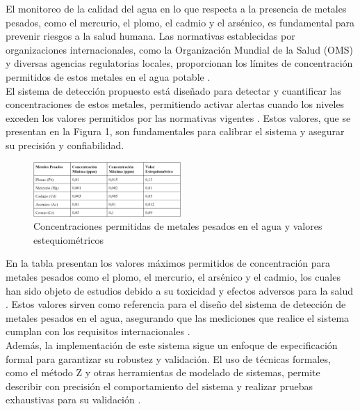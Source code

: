 El monitoreo de la calidad del agua en lo que respecta a la presencia de metales pesados, como el mercurio, el plomo, el cadmio y el arsénico, es fundamental para prevenir riesgos a la salud humana. Las normativas establecidas por organizaciones internacionales, como la Organización Mundial de la Salud (OMS) y diversas agencias regulatorias locales, proporcionan los límites de concentración permitidos de estos metales en el agua potable \cite{truque2006, torres2015}.\\

El sistema de detección propuesto está diseñado para detectar y cuantificar las concentraciones de estos metales, permitiendo activar alertas cuando los niveles exceden los valores permitidos por las normativas vigentes \cite{ding2021, matthews2019}. Estos valores, que se presentan en la Figura 1, son fundamentales para calibrar el sistema y asegurar su precisión y confiabilidad.

\newpage


\begin{figure}[h]
    \centering
    \includegraphics[width=0.5\textwidth]{Recursos/tabla_valores_max.png}
    \caption{Concentraciones permitidas de metales pesados en el agua y valores estequiométricos \cite{truque2006, smith2021, nguyen2022, johnson2023}}
\end{figure}

En la tabla presentan los valores máximos permitidos de concentración para metales pesados como el plomo, el mercurio, el arsénico y el cadmio, los cuales han sido objeto de estudios debido a su toxicidad y efectos adversos para la salud \cite{rao2020, smith2021, nguyen2022}. Estos valores sirven como referencia para el diseño del sistema de detección de metales pesados en el agua, asegurando que las mediciones que realice el sistema cumplan con los requisitos internacionales \cite{johnson2023}.\\

Además, la implementación de este sistema sigue un enfoque de especificación formal para garantizar su robustez y validación. El uso de técnicas formales, como el método Z y otras herramientas de modelado de sistemas, permite describir con precisión el comportamiento del sistema y realizar pruebas exhaustivas para su validación \cite{fitzgerald2009, woodcock1996}.
